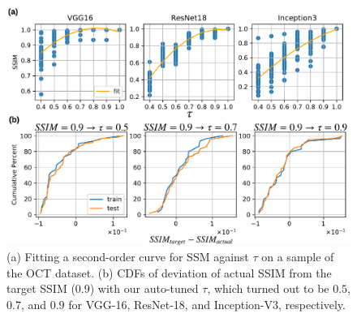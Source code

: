 \begin{figure}[t]
\includegraphics[width=\columnwidth]{images/system_tuning}
\caption{(a) Fitting a second-order curve for SSM against $\tau$ on a sample of the OCT dataset. 
(b) CDFs of deviation of actual SSIM from the target SSIM ($0.9$) with our auto-tuned $\tau$, which turned out to be $0.5$, $0.7$, and $0.9$ for VGG-16, ResNet-18, and Inception-V3, respectively.}
\label{fig:system_tuning}
\vspace{-4mm}
\end{figure}


